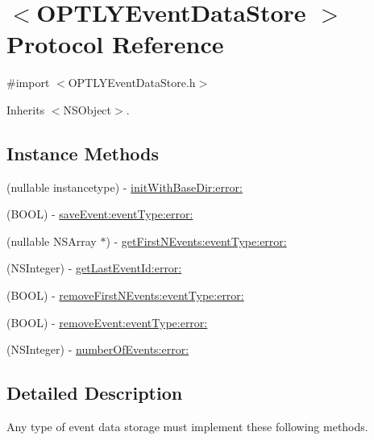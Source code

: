\hypertarget{protocol_o_p_t_l_y_event_data_store_01-p}{}\section{$<$O\+P\+T\+L\+Y\+Event\+Data\+Store $>$ Protocol Reference}
\label{protocol_o_p_t_l_y_event_data_store_01-p}


{\ttfamily \#import $<$O\+P\+T\+L\+Y\+Event\+Data\+Store.\+h$>$}



Inherits $<$\+N\+S\+Object$>$.

\subsection*{Instance Methods}
\begin{DoxyCompactItemize}
\item 
(nullable instancetype) -\/ \mbox{\hyperlink{protocol_o_p_t_l_y_event_data_store_01-p_a896d8f51ae3ba19b59bf1448301c2df9}{init\+With\+Base\+Dir\+:error\+:}}
\item 
(B\+O\+OL) -\/ \mbox{\hyperlink{protocol_o_p_t_l_y_event_data_store_01-p_acda8107731ff62f01b767c35d39d5b2b}{save\+Event\+:event\+Type\+:error\+:}}
\item 
(nullable N\+S\+Array $\ast$) -\/ \mbox{\hyperlink{protocol_o_p_t_l_y_event_data_store_01-p_a1d0c6fe9b9aea7a190cca6fd78c5f413}{get\+First\+N\+Events\+:event\+Type\+:error\+:}}
\item 
(N\+S\+Integer) -\/ \mbox{\hyperlink{protocol_o_p_t_l_y_event_data_store_01-p_a82c02b9f8d997fc8436b956043858054}{get\+Last\+Event\+Id\+:error\+:}}
\item 
(B\+O\+OL) -\/ \mbox{\hyperlink{protocol_o_p_t_l_y_event_data_store_01-p_a3b0e0225eaaf2e0c108e0fd167eec660}{remove\+First\+N\+Events\+:event\+Type\+:error\+:}}
\item 
(B\+O\+OL) -\/ \mbox{\hyperlink{protocol_o_p_t_l_y_event_data_store_01-p_ad94b56bc2e37603df7e868f11b38a9b8}{remove\+Event\+:event\+Type\+:error\+:}}
\item 
(N\+S\+Integer) -\/ \mbox{\hyperlink{protocol_o_p_t_l_y_event_data_store_01-p_a59aa5d4995f2d9bcaca525c9001043f4}{number\+Of\+Events\+:error\+:}}
\end{DoxyCompactItemize}


\subsection{Detailed Description}
Any type of event data storage must implement these following methods. 

